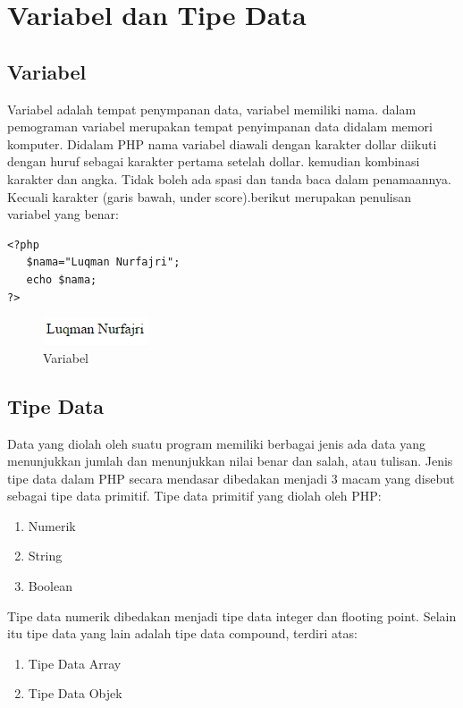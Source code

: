 \section{Variabel dan Tipe Data}
\subsection{Variabel}
Variabel adalah tempat penympanan data, variabel memiliki nama. dalam pemograman variabel merupakan tempat penyimpanan data didalam memori komputer. Didalam PHP nama variabel diawali dengan karakter dollar diikuti dengan huruf sebagai karakter pertama setelah dollar. kemudian kombinasi karakter dan angka. Tidak boleh ada spasi dan tanda baca dalam penamaannya. Kecuali karakter (garis bawah, under score).berikut merupakan penulisan variabel yang benar:

\begin{lstlisting}
<?php
   $nama="Luqman Nurfajri";
   echo $nama;
?>
\end{lstlisting}
\begin{figure}[h]
\centering
\includegraphics[scale=1]{figures/variabel}
\caption{Variabel}
\label{variabel}
\end{figure}
\subsection{Tipe Data}
Data yang diolah oleh suatu program memiliki berbagai jenis ada data yang menunjukkan jumlah dan menunjukkan nilai benar dan salah, atau tulisan. Jenis tipe data dalam PHP secara mendasar dibedakan menjadi 3 macam yang disebut sebagai tipe data primitif. Tipe data primitif yang diolah oleh PHP:
\begin{enumerate}
\item Numerik
\item String
\item Boolean
\end{enumerate}
Tipe data numerik dibedakan menjadi tipe data integer dan flooting point. Selain itu tipe data yang lain adalah tipe data compound, terdiri atas:
\begin{enumerate}
\item Tipe Data Array
\item Tipe Data Objek 
\end{enumerate}


